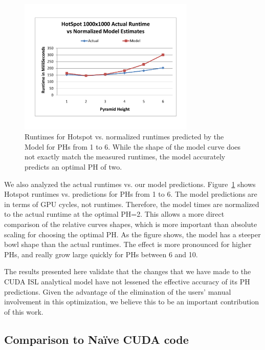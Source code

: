 \documentclass[preprint,nocopyrightspace]{styles/sigplanconf}
\begin{document}
\begin{figure}
\includegraphics[clip,trim=1in 1in 1in 1in,width=3.3in]{figures/HotSpotModelActual}
\caption{
Runtimes for Hotspot vs. normalized runtimes predicted 
by the Model for PHs from 1 to 6.  
While the shape of the model curve does not exactly match the measured runtimes,
the model accurately predicts an optimal PH of two.
}
\label{fig:modelvsactual}
\end{figure}

We also analyzed the actual runtimes vs. our model predictions.  
Figure~\ref{fig:modelvsactual} shows Hotspot runtimes vs. predictions for 
PHs from 1 to 6.  
The model predictions are in terms of GPU cycles, not runtimes.  
Therefore, the model times are normalized to the actual runtime at the optimal PH=2.
This allows a more direct comparison of the relative curves shapes, which is
more important than absolute scaling for choosing the optimal PH.
As the figure shows, the model has a steeper bowl shape
than the actual runtimes.  The effect is more pronounced for higher PHs, and really grow large quickly for PHs 
between 6 and 10.

The results presented here validate that the changes that we have made to the 
CUDA ISL analytical model have not lessened the effective accuracy of its PH predictions.
Given the advantage of the elimination of the users' manual involvement in this 
optimization, we believe this to be an important contribution of this work.

\subsection{Comparison to Na\"{i}ve CUDA code}
\end{document}
